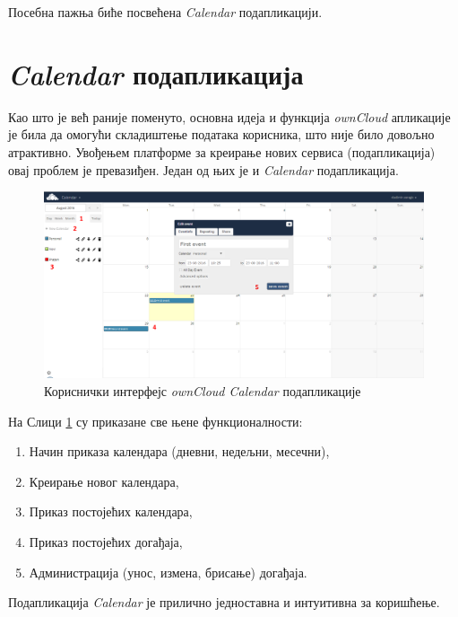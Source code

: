Посебна пажња биће посвећена \textit{Calendar} подапликацији.

\section{\textit{Calendar} подапликација}

Као што је већ раније поменуто, основна идеја и функција \textit{ownCloud} апликације је била да омогући складиштење података корисника, што није било довољно атрактивно. Увођењем платформе за креирање нових сервиса (подапликација) овај проблем је превазиђен. Један од њих је и \textit{Calendar} подапликација.

\begin{figure}[H]
	\centering
	\includegraphics[scale=0.4]{slike/ownCloudCalendarDetails.png}
	\caption{Кориснички интерфејс \textit{ownCloud Calendar} подапликације}
	\label{fig:own_cloud_calendar_details}
\end{figure}

На Слици \ref{fig:own_cloud_calendar_details} су приказане све њене функционалности:
\begin{enumerate}
	\item Начин приказа календара (дневни, недељни, месечни),
	\item Креирање новог календара,
	\item Приказ постојећих календара,
	\item Приказ постојећих догађаја,
	\item Администрација (унос, измена, брисање) догађаја.
\end{enumerate}

Подапликација \textit{Calendar} је прилично једноставна и интуитивна за коришћење.